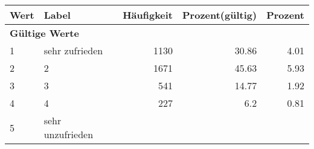      \begin{longtable}{lXrrr}
     \toprule
     \textbf{Wert} & \textbf{Label} & \textbf{Häufigkeit} & \textbf{Prozent(gültig)} & \textbf{Prozent} \\
     \endhead
     \midrule
     \multicolumn{5}{l}{\textbf{Gültige Werte}}\\

     1 &
     \multicolumn{1}{X}{ sehr zufrieden   } &


       \num{1130} &
       \num[round-mode=places,round-precision=2]{30,86} &
         \num[round-mode=places,round-precision=2]{4,01} \\

     2 &
     \multicolumn{1}{X}{ 2   } &


       \num{1671} &
       \num[round-mode=places,round-precision=2]{45,63} &
         \num[round-mode=places,round-precision=2]{5,93} \\

     3 &
     \multicolumn{1}{X}{ 3   } &


       \num{541} &
       \num[round-mode=places,round-precision=2]{14,77} &
         \num[round-mode=places,round-precision=2]{1,92} \\

     4 &
     \multicolumn{1}{X}{ 4   } &


       \num{227} &
       \num[round-mode=places,round-precision=2]{6,2} &
         \num[round-mode=places,round-precision=2]{0,81} \\

     5 &
     \multicolumn{1}{X}{ sehr unzufrieden   } &



\end{longtable}
